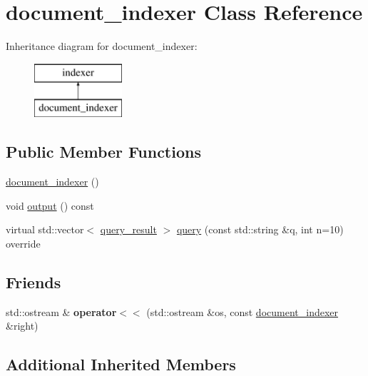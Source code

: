 \hypertarget{classdocument__indexer}{}\section{document\+\_\+indexer Class Reference}
\label{classdocument__indexer}
Inheritance diagram for document\+\_\+indexer\+:\begin{figure}[H]
\begin{center}
\leavevmode
\includegraphics[height=2.000000cm]{classdocument__indexer}
\end{center}
\end{figure}
\subsection*{Public Member Functions}
\begin{DoxyCompactItemize}
\item 
\hyperlink{classdocument__indexer_a569b5a1dc381efce6ab2ab64644a7662}{document\+\_\+indexer} ()
\item 
void \hyperlink{classdocument__indexer_a1083fc1bf4418300f97c17a9d2b51820}{output} () const
\item 
virtual std\+::vector$<$ \hyperlink{classquery__result}{query\+\_\+result} $>$ \hyperlink{classdocument__indexer_a6cb56a642b9d5cb2d3c1e0a3ef6c8a46}{query} (const std\+::string \&q, int n=10) override
\end{DoxyCompactItemize}
\subsection*{Friends}
\begin{DoxyCompactItemize}
\item 
\mbox{\label{classdocument__indexer_aa6925b3d886b1c21f2138ded7b5b05dc}} 
std\+::ostream \& {\bfseries operator$<$$<$} (std\+::ostream \&os, const \hyperlink{classdocument__indexer}{document\+\_\+indexer} \&right)
\end{DoxyCompactItemize}
\subsection*{Additional Inherited Members}


